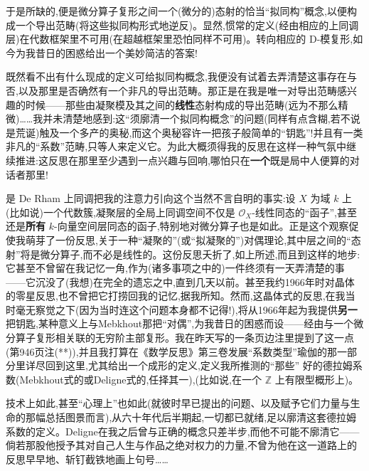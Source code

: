 \noindent 于是所缺的,便是微分算子复形之间一个(微分的)态射的恰当“拟同构”概念,\dmark{}以便构成一个导出范畴(将这些拟同构形式地逆反)。显然,惯常的定义(经由相应的上同调层)在代数框架里不可用(在超越框架里恐怕同样不可用)。转向相应的 D-模复形,如今为我昔日的困惑给出一个美妙简洁的答案!

既然看不出有什么现成的定义可给拟同构概念,我便没有试着去弄清楚这事存在与否,以及那里是否确然有一个非凡的导出范畴。那正是在我是唯一对导出范畴感兴趣的时候——那些由凝聚模及其之间的\textbf{线性}态射构成的导出范畴(远为不那么精微)……我并未清楚地感到:这“须廓清一个拟同构概念”的问题(同样有点含糊,若不说是荒诞)触及一个多产的奥秘,而这个奥秘容许一把孩子般简单的“钥匙”!并且有一类非凡的“系数”范畴,只等人来定义它。为此大概须得我的反思在这样一种气氛中继续推进:这反思在那里至少遇到一点兴趣与回响,哪怕只在\textbf{一个}既是局中人便算的对话者那里!

是 De Rham 上同调把我的注意力引向这个当然不言自明的事实:设 $X$ 为域 $k$ 上(比如说)一个代数簇,凝聚层的全局上同调空间不仅是 $\mathcal{O}_X$-线性同态的“函子”,甚至还是\textbf{所有} $k$-向量空间层同态的函子,特别地对微分算子也是如此。正是这个观察促使我萌芽了一份反思,关于一种“凝聚的”(或“拟凝聚的”)对偶理论,其中层之间的“态射”将是微分算子,而不必是线性的。这份反思夭折了,如上所述,而且到这样的地步:它甚至不曾留在我记忆一角,作为(诸多事项之中的)一件终须\dmark{}有一天弄清楚的事——它沉没了(我想)在完全的遗忘之中,直到几天以前。甚至我约1966年时对晶体的零星反思,也不曾把它打捞回我的记忆,据我所知。然而,这晶体式的反思,在我当时毫无察觉之下(因为当时连这个问题本身都不记得!),将从1966年起为我提供\textbf{另一}把钥匙,某种意义上与Mebkhout那把“对偶”,为我昔日的困惑而设——经由与一个微分算子复形相关联的无穷阶主部复形。我在昨天写的一条页边注里提到了这一点(第946页注(**)),并且我打算在《数学反思》第三卷发展“系数类型”瑜伽的那一部分里详尽回到这里,尤其给出一个成形的定义,定义我所推测的“那些”
好的德拉姆系数(Mebkhout式的或Deligne式的,任择其一),(比如说,在一个 $\mathbb{Z}$ 上有限型概形上)。

\noindent 技术上如此,甚至“心理上”也如此(就彼时早已提出的问题、以及赋予它们力量与生命的那幅总括图景而言),从六十年代后半期起,一切都已就绪,足以廓清这套德拉姆系数的定义。Deligne在我之后曾与正确的概念只差半步,而他不可能不廓清它——倘若那股他授予其对自己人生与作品之绝对权力的力量,不曾为他在这一道路上的反思早早地、斩钉截铁地画上句号……

